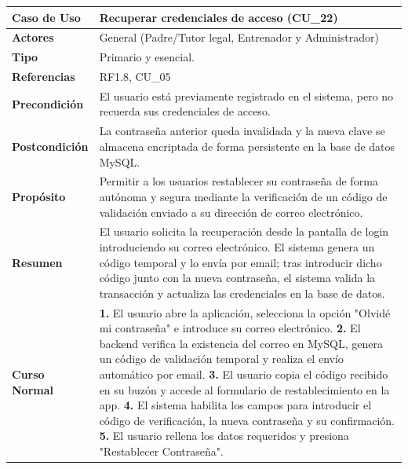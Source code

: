         \begin{table}[htbp]
        \centering
        \footnotesize
        \renewcommand{\arraystretch}{1.0}
        \begin{tabularx}{\textwidth}{|l|X|}
        \hline
        \rowcolor[HTML]{EFEFEF} 
        \textbf{Caso de Uso} & \textbf{Recuperar credenciales de acceso (CU\_22)} \\ \hline
        \textbf{Actores} & General (Padre/Tutor legal, Entrenador y Administrador) \\ \hline
        \textbf{Tipo} & Primario y esencial. \\ \hline
        \textbf{Referencias} & RF1.8, CU\_05 \\ \hline
        \textbf{Precondición} & El usuario está previamente registrado en el sistema, pero no recuerda sus credenciales de acceso. \\ \hline
        \textbf{Postcondición} & La contraseña anterior queda invalidada y la nueva clave se almacena encriptada de forma persistente en la base de datos MySQL. \\ \hline
        \textbf{Propósito} & Permitir a los usuarios restablecer su contraseña de forma autónoma y segura mediante la verificación de un código de validación enviado a su dirección de correo electrónico. \\ \hline
        \textbf{Resumen} & El usuario solicita la recuperación desde la pantalla de login introduciendo su correo electrónico. El sistema genera un código temporal y lo envía por email; tras introducir dicho código junto con la nueva contraseña, el sistema valida la transacción y actualiza las credenciales en la base de datos. \\ \hline
        \textbf{Curso Normal} & 
        \textbf{1.} El usuario abre la aplicación, selecciona la opción "Olvidé mi contraseña" e introduce su correo electrónico.\newline
        \textbf{2.} El backend verifica la existencia del correo en MySQL, genera un código de validación temporal y realiza el envío automático por email.\newline
        \textbf{3.} El usuario copia el código recibido en su buzón y accede al formulario de restablecimiento en la app.\newline
        \textbf{4.} El sistema habilita los campos para introducir el código de verificación, la nueva contraseña y su confirmación.\newline
        \textbf{5.} El usuario rellena los datos requeridos y presiona "Restablecer Contraseña".\newline

\end{tabularx}
\end{table}
